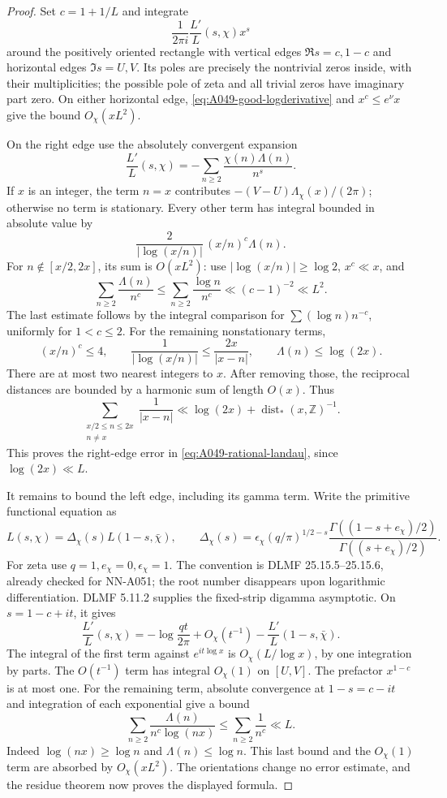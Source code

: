 \begin{proof}
Set \(c=1+1/L\) and integrate
\[
                  \frac1{2\pi i}\frac{L'}{L}(s,\chi)x^s
\]
around the positively oriented rectangle with vertical edges
\(\Re s=c,1-c\) and horizontal edges \(\Im s=U,V\).
Its poles are precisely the nontrivial zeros inside, with
their multiplicities; the possible pole of zeta and all
trivial zeros have imaginary part zero.
On either horizontal edge,
\eqref{eq:A049-good-logderivative} and
\(x^c\le e^\nu x\) give the bound \(O_\chi(xL^2)\).

On the right edge use the absolutely convergent expansion
\[
             \frac{L'}{L}(s,\chi)
                   =-\sum_{n\ge2}\frac{\chi(n)\Lambda(n)}{n^s}.
\]
If \(x\) is an integer, the term \(n=x\) contributes
\(-(V-U)\Lambda_\chi(x)/(2\pi)\); otherwise no term is
stationary. Every other term has integral bounded in
absolute value by
\[
              \frac{2}{|\log(x/n)|}\,(x/n)^c\Lambda(n).
\]
For \(n\notin[x/2,2x]\), its sum is \(O(xL^2)\):
use \(|\log(x/n)|\ge\log2\), \(x^c\ll x\), and
\[
 \sum_{n\ge2}\frac{\Lambda(n)}{n^c}
 \le \sum_{n\ge2}\frac{\log n}{n^c}\ll(c-1)^{-2}\ll L^2.
\]
The last estimate follows by the integral comparison for
\(\sum(\log n)n^{-c}\), uniformly for \(1<c\le2\).
For the remaining nonstationary terms,
\[
 (x/n)^c\le4,\qquad
 \frac1{|\log(x/n)|}\le\frac{2x}{|x-n|},\qquad
 \Lambda(n)\le\log(2x).
\]
There are at most two nearest integers to \(x\). After removing
those, the reciprocal distances are bounded by a harmonic
sum of length \(O(x)\). Thus
\[
 \sum_{\substack{x/2\le n\le2x\\ n\ne x}}\frac1{|x-n|}
       \ll \log(2x)+\operatorname{dist}_*(x,\mathbb Z)^{-1}.
\]
This proves the right-edge error in
\eqref{eq:A049-rational-landau}, since \(\log(2x)\ll L\).

It remains to bound the left edge, including its gamma term.
Write the primitive functional equation as
\[
 L(s,\chi)=\Delta_\chi(s)L(1-s,\bar\chi),\qquad
 \Delta_\chi(s)=\epsilon_\chi
    (q/\pi)^{1/2-s}
    \frac{\Gamma((1-s+e_\chi)/2)}{\Gamma((s+e_\chi)/2)}.
\]
For zeta use \(q=1,e_\chi=0,\epsilon_\chi=1\).
The convention is DLMF 25.15.5--25.15.6, already checked
for NN-A051; the root number disappears upon logarithmic
differentiation. DLMF 5.11.2 supplies the fixed-strip digamma
asymptotic. On \(s=1-c+it\), it gives
\[
 \frac{L'}{L}(s,\chi)
   =-\log\frac{qt}{2\pi}+O_\chi(t^{-1})
                   -\frac{L'}{L}(1-s,\bar\chi).
\]
The integral of the first term against \(e^{it\log x}\) is
\(O_\chi(L/\log x)\), by one integration by parts.
The \(O(t^{-1})\) term has integral \(O_\chi(1)\) on
\([U,V]\). The prefactor \(x^{1-c}\) is at most one.
For the remaining term, absolute convergence at \(1-s=c-it\)
and integration of each exponential give a bound
\[
 \sum_{n\ge2}\frac{\Lambda(n)}{n^c\log(nx)}
      \le \sum_{n\ge2}\frac1{n^c}\ll L.
\]
Indeed \(\log(nx)\ge\log n\) and \(\Lambda(n)\le\log n\).
This last bound and the \(O_\chi(1)\) term are absorbed by
\(O_\chi(xL^2)\). The orientations change no error estimate,
and the residue theorem now proves the displayed formula.
\end{proof}

